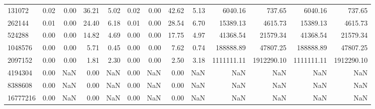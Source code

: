 \begin{tabular}{lrrrrrrrrrrrr}
131072 & 0.02 & 0.00 & 36.21 & 5.02 & 0.02 & 0.00 & 42.62 & 5.13 & 6040.16 & 737.65 & 6040.16 & 737.65 \\
262144 & 0.01 & 0.00 & 24.40 & 6.18 & 0.01 & 0.00 & 28.54 & 6.70 & 15389.13 & 4615.73 & 15389.13 & 4615.73 \\
524288 & 0.00 & 0.00 & 14.82 & 4.69 & 0.00 & 0.00 & 17.75 & 4.97 & 41368.54 & 21579.34 & 41368.54 & 21579.34 \\
1048576 & 0.00 & 0.00 & 5.71 & 0.45 & 0.00 & 0.00 & 7.62 & 0.74 & 188888.89 & 47807.25 & 188888.89 & 47807.25 \\
2097152 & 0.00 & 0.00 & 1.81 & 2.30 & 0.00 & 0.00 & 2.50 & 3.18 & 1111111.11 & 1912290.10 & 1111111.11 & 1912290.10 \\
4194304 & 0.00 & NaN & 0.00 & NaN & 0.00 & NaN & 0.00 & NaN & NaN & NaN & NaN & NaN \\
8388608 & 0.00 & NaN & 0.00 & NaN & 0.00 & NaN & 0.00 & NaN & NaN & NaN & NaN & NaN \\
16777216 & 0.00 & NaN & 0.00 & NaN & 0.00 & NaN & 0.00 & NaN & NaN & NaN & NaN & NaN \\
\bottomrule
\end{tabular}
